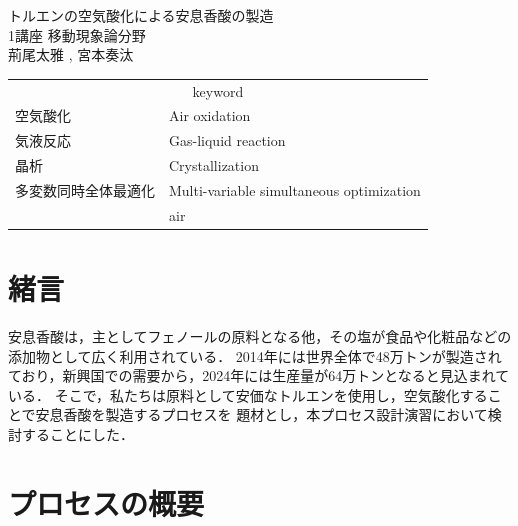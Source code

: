 \documentclass[a4j]{jsreport}
\begin{document}
\begin{titlepage}
\vspace{5cm}
\centering
{\Huge トルエンの空気酸化による安息香酸の製造}\\
\vspace{2cm}
\centering
{\Large 1講座 移動現象論分野}\\
\vspace{0.5cm}
\centering
{\large 荊尾太雅 , 宮本奏汰}\\
\vspace{3cm}
\begin{table}[htbp]
    \begin{center}
        \begin{tabular}[htbp]{ll}
            \multicolumn{2}{c}{{\LARGE keyword}}\\
            {\Large 空気酸化}&{\Large Air oxidation}\\
            {\Large 気液反応}&{\Large Gas-liquid reaction}\\
            {\Large 晶析}&{\Large Crystallization}\\
            {\Large 多変数同時全体最適化}&{\Large Multi-variable simultaneous optimization}\\
            {\Large }&{\Large air}\\
        \end{tabular}
    \end{center}
\end{table}
\end{titlepage}


\setcounter{tocdepth}{2}
\tableofcontents

\newpage
{}

\chapter{緒言}


安息香酸は，主としてフェノールの原料となる他，その塩が食品や化粧品などの添加物として広く利用されている．
2014年には世界全体で48万トンが製造されており，新興国での需要から，2024年には生産量が64万トンとなると見込まれている．
そこで，私たちは原料として安価なトルエンを使用し，空気酸化することで安息香酸を製造するプロセスを
題材とし，本プロセス設計演習において検討することにした．

\newpage
\chapter{プロセスの概要}
\end{document}
